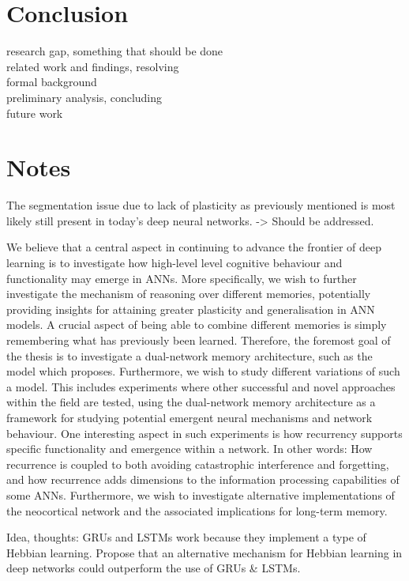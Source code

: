 \section{Conclusion}

research gap, something that should be done
\\
related work and findings, resolving
\\
formal background
\\
preliminary analysis, concluding
\\
future work


\section{Notes}

The segmentation issue due to lack of plasticity as previously mentioned is most likely still present in today's deep neural networks. -> Should be addressed.



We believe that a central aspect in continuing to advance the frontier of deep learning is to investigate how high-level level cognitive behaviour and functionality may emerge in ANNs. More specifically, we wish to further investigate the mechanism of reasoning over different memories, potentially providing insights for attaining greater plasticity and generalisation in ANN models. A crucial aspect of being able to combine different memories is simply remembering what has previously been learned. Therefore, the foremost goal of the thesis is to investigate a dual-network memory architecture, such as the model which \cite{Hattori2014} proposes. 
Furthermore, we wish to study different variations of such a model. This includes experiments where other successful and novel approaches within the field are tested, using the dual-network memory architecture as a framework for studying potential emergent neural mechanisms and network behaviour.
One interesting aspect in such experiments is how recurrency supports specific functionality and emergence within a network. In other words: How recurrence is coupled to both avoiding catastrophic interference and forgetting, and how recurrence adds dimensions to the information processing capabilities of some ANNs. Furthermore, we wish to investigate alternative implementations of the neocortical network and the associated implications for long-term memory.

Idea, thoughts: GRUs and LSTMs work because they implement a type of Hebbian learning. 
Propose that an alternative mechanism for Hebbian learning in deep networks could outperform the use of GRUs \& LSTMs.

\cleardoublepage